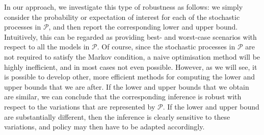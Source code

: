 \documentclass[10pt,a4paper]{paper}
\theoremstyle{definition}
\begin{document}
In our approach, we investigate this type of robustness as follows: we simply consider the probability or expectation of interest for each of the stochastic processes in $\mathcal{P}$, and then report the corresponding lower and upper bound. Intuitively, this can be regarded as providing best- and worst-case scenarios with respect to all the models in $\mathcal{P}$.
Of course, since the stochastic processes in $\mathcal{P}$ are not required to satisfy the Markov condition, a naive optimisation method will be highly inefficient, and in most cases not even possible. However, as we will see, it is possible to develop other, more efficient methods for computing the lower and upper bounds that we are after. If the lower and upper bounds that we obtain are similar, we can conclude that the corresponding inference is robust with respect to the variations that are represented by $\mathcal{P}$. If the lower and upper bound are substantially different, then the inference is clearly sensitive to these variations, and policy may then have to be adapted accordingly. 



\end{document}

